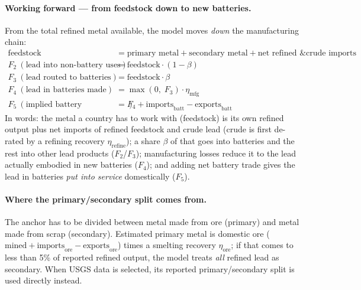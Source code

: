 \documentclass[11pt,a4paper]{article}
\begin{document}
\paragraph{Working forward --- from feedstock down to new batteries.} From the
total refined metal available, the model moves \emph{down} the manufacturing chain:
\begin{align*}
\text{feedstock} &= \text{primary metal} + \text{secondary metal} + \text{net refined \& crude imports} \\
F_2\ (\text{lead into non-battery uses}) &= \text{feedstock} \cdot (1-\beta) \\
F_3\ (\text{lead routed to batteries}) &= \text{feedstock} \cdot \beta \\
F_4\ (\text{lead in batteries made}) &= \max(0,\;F_3)\cdot\eta_{\text{mfg}} \\
F_5\ (\text{implied battery consumption}) &= F_4 + \text{imports}_{\text{batt}} - \text{exports}_{\text{batt}}
\end{align*}
In words: the metal a country has to work with (feedstock) is its own refined
output plus net imports of refined feedstock and crude lead (crude is first
de-rated by a refining recovery $\eta_{\text{refine}}$); a share $\beta$ of that
goes into batteries and the rest into other lead products ($F_2$/$F_3$);
manufacturing losses reduce it to the lead actually embodied in new batteries
($F_4$); and adding net battery trade gives the lead in batteries \emph{put into
service} domestically ($F_5$).

\paragraph{Where the primary/secondary split comes from.} The anchor has to be
divided between metal made from ore (primary) and metal made from scrap
(secondary). Estimated primary metal is domestic ore
($\text{mined}+\text{imports}_{\text{ore}}-\text{exports}_{\text{ore}}$) times a
smelting recovery $\eta_{\text{ore}}$; if that comes to less than 5\% of reported
refined output, the model treats \emph{all} refined lead as secondary. When USGS
data is selected, its reported primary/secondary split is used directly instead.
\end{document}
